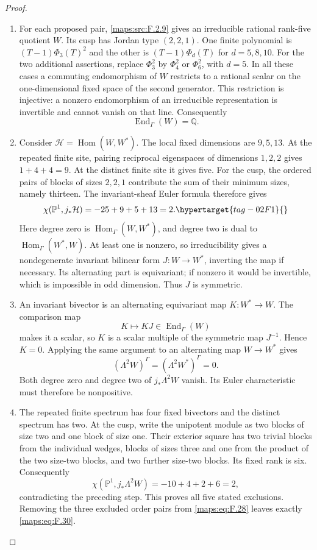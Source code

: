 \documentclass[11pt,a4paper]{article}
\numberwithin{equation}{section}
\theoremstyle{definition}
\begin{document}
\begin{proof}
\begin{enumerate}[label=\arabic*.]
\item For each proposed pair, \ref{maps:src:F.2.9} gives an
irreducible rational rank-five quotient $W$.  Its cusp has Jordan
type $(2,2,1)$.  One finite polynomial is
$(T-1)\Phi_3(T)^2$ and the other is $(T-1)\Phi_d(T)$ for
$d=5,8,10$.  For the two additional assertions, replace
$\Phi_3^2$ by $\Phi_4^2$ or $\Phi_6^2$, with $d=5$.
In all these cases a commuting endomorphism of $W$ restricts to a
rational scalar on the one-dimensional fixed space of the second
generator.  This restriction is injective: a nonzero endomorphism
of an irreducible representation is invertible and cannot vanish
on that line.  Consequently
\[
 \operatorname{End}_{\Gamma}(W)=\mathbb Q.
\]

\item Consider $\mathcal H=\operatorname{Hom}(W,W^*)$.
The local fixed dimensions are $9,5,13$.  At the repeated finite
site, pairing reciprocal eigenspaces of dimensions $1,2,2$ gives
$1+4+4=9$.  At the distinct finite site it gives five.
For the cusp, the ordered pairs of blocks of sizes $2,2,1$
contribute the sum of their minimum sizes, namely thirteen.
The invariant-sheaf Euler formula therefore gives
\begin{equation}
 \chi(\mathbb P^1,j_*\mathcal H)=-25+9+5+13=2.
 \hypertarget{tag-02F1}{}\label{maps:eq:F.31}
\end{equation}
Here degree zero is $\operatorname{Hom}_{\Gamma}(W,W^*)$,
and degree two is dual to
$\operatorname{Hom}_{\Gamma}(W^*,W)$.  At least one is nonzero,
so irreducibility gives a nondegenerate invariant bilinear form
$J:W\longrightarrow W^*$, inverting the map if necessary.
Its alternating part is equivariant; if nonzero it would be
invertible, which is impossible in odd dimension.  Thus $J$ is
symmetric.

\item An invariant bivector is an alternating equivariant map
$K:W^*\longrightarrow W$.  The comparison map
\[
 K\longmapsto KJ\in\operatorname{End}_{\Gamma}(W)
\]
makes it a scalar, so $K$ is a scalar multiple of the symmetric
map $J^{-1}$.  Hence $K=0$.  Applying the same argument to an
alternating map $W\longrightarrow W^*$ gives
\[
 (\Lambda^2W)^\Gamma=(\Lambda^2W^*)^\Gamma=0.
\]
Both degree zero and degree two of $j_*\Lambda^2W$ vanish.
Its Euler characteristic must therefore be nonpositive.

\item The repeated finite spectrum has four fixed bivectors and
the distinct spectrum has two.  At the cusp, write the unipotent
module as two blocks of size two and one block of size one.
Their exterior square has two trivial blocks from the individual
wedges, blocks of sizes three and one from the product of the
two size-two blocks, and two further size-two blocks.  Its fixed
rank is six.  Consequently
\[
 \chi(\mathbb P^1,j_*\Lambda^2W)=-10+4+2+6=2,
\]
contradicting the preceding step.  This proves all five stated
exclusions.  Removing the three excluded order pairs from
\eqref{maps:eq:F.28} leaves exactly \eqref{maps:eq:F.30}.
\end{enumerate}
\end{proof}
\end{document}
